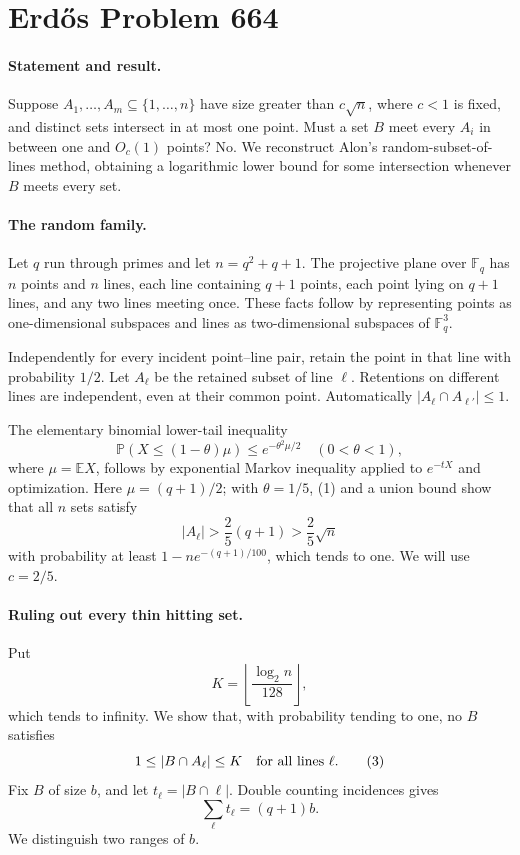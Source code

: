 \section*{Erd\H{o}s Problem 664}

\paragraph{Statement and result.}
Suppose \(A_1,\ldots,A_m\subseteq\{1,\ldots,n\}\) have size greater than \(c\sqrt n\), where \(c<1\) is fixed, and distinct sets intersect in at most one point. Must a set \(B\) meet every \(A_i\) in between one and \(O_c(1)\) points? No. We reconstruct Alon's random-subset-of-lines method, obtaining a logarithmic lower bound for some intersection whenever \(B\) meets every set.

\paragraph{The random family.}
Let \(q\) run through primes and let \(n=q^2+q+1\). The projective plane over \(\mathbb F_q\) has \(n\) points and \(n\) lines, each line containing \(q+1\) points, each point lying on \(q+1\) lines, and any two lines meeting once. These facts follow by representing points as one-dimensional subspaces and lines as two-dimensional subspaces of \(\mathbb F_q^3\).

Independently for every incident point--line pair, retain the point in that line with probability \(1/2\). Let \(A_\ell\) be the retained subset of line \(\ell\). Retentions on different lines are independent, even at their common point. Automatically \(|A_\ell\cap A_{\ell'}|\leq1\).

The elementary binomial lower-tail inequality
\[
 \mathbb P(X\leq(1-\theta)\mu)\leq e^{-\theta^2\mu/2}
 \quad(0<\theta<1), \tag{1}
\]
where \(\mu=\mathbb E X\), follows by exponential Markov inequality applied to \(e^{-tX}\) and optimization. Here \(\mu=(q+1)/2\); with \(\theta=1/5\), (1) and a union bound show that all \(n\) sets satisfy
\[
 |A_\ell|>\frac25(q+1)>\frac25\sqrt n \tag{2}
\]
with probability at least \(1-ne^{-(q+1)/100}\), which tends to one. We will use \(c=2/5\).

\paragraph{Ruling out every thin hitting set.}
Put
\[
 K=\left\lfloor\frac{\log_2 n}{128}\right\rfloor,
\]
which tends to infinity. We show that, with probability tending to one, no \(B\) satisfies
\[
 1\leq |B\cap A_\ell|\leq K\quad\hbox{for all lines }\ell. \tag{3}
\]
Fix \(B\) of size \(b\), and let \(t_\ell=|B\cap\ell|\). Double counting incidences gives
\[
 \sum_\ell t_\ell=(q+1)b. \tag{4}
\]
We distinguish two ranges of \(b\).

